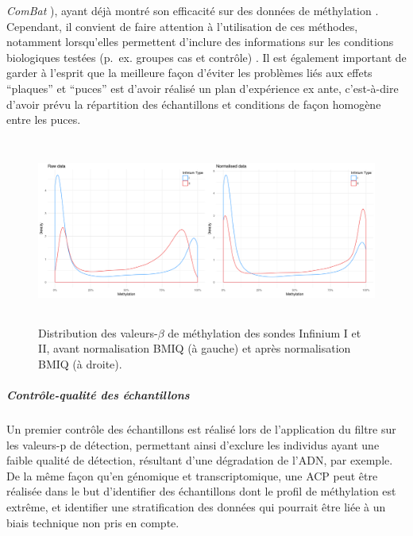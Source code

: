 \documentclass[11pt,a4paper,notrimn]{krantz}
\let\oldsubparagraph\subparagraph
\renewcommand{\subparagraph}[1]{\oldsubparagraph{#1}\mbox{}}
\theoremstyle{definition}
\theoremstyle{definition}
\theoremstyle{remark}
\begin{document}
\begin{itemize}
\begin{itemize}
    \emph{ComBat} \citep{johnson_adjusting_2007, leek_sva_2012}), ayant
    déjà montré son efficacité sur des données de méthylation
    \citep{sun_batch_2011, leek_tackling_2010}. Cependant, il convient
    de faire attention à l'utilisation de ces méthodes, notamment
    lorsqu'elles permettent d'inclure des informations sur les
    conditions biologiques testées (p.~ex. groupes cas et contrôle)
    \citep{nygaard_methods_2015}. Il est également important de garder à
    l'esprit que la meilleure façon d'éviter les problèmes liés aux
    effets ``plaques'' et ``puces'' est d'avoir réalisé un plan
    d'expérience ex ante, c'est-à-dire d'avoir prévu la répartition des
    échantillons et conditions de façon homogène entre les puces.
  \end{itemize}
\end{itemize}






\begin{figure}[!htb]

{\centering \includegraphics[width=6in,height=2.4in]{FiguresTables/InfiniumType} 

}

\caption{Distribution des valeurs-\(\beta\) de méthylation des sondes
Infinium I et II, avant normalisation BMIQ
\citep{teschendorff_beta-mixture_2013} (à gauche) et après normalisation
BMIQ (à droite).}\label{fig:BMIQ}
\end{figure}

\subparagraph{Contrôle-qualité des
échantillons}\label{controle-qualite-des-echantillons}

Un premier contrôle des échantillons est réalisé lors de l'application
du filtre sur les valeurs-p de détection, permettant ainsi d'exclure les
individus ayant une faible qualité de détection, résultant d'une
dégradation de l'ADN, par exemple. De la même façon qu'en génomique et
transcriptomique, une ACP peut être réalisée dans le but d'identifier
des échantillons dont le profil de méthylation est extrême, et
identifier une stratification des données qui pourrait être liée à un
biais technique non pris en compte.
\end{document}
